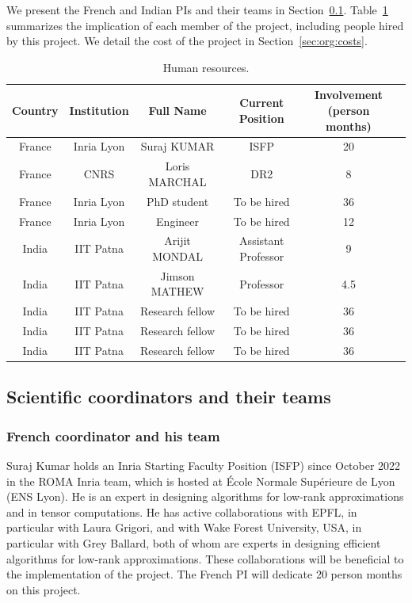 \documentclass[a4paper,11pt]{article}
\begin{document}
We present the French and Indian PIs and their teams in Section~\ref{sec:org:team}. Table~\ref{tab:human} summarizes the implication of each member of the project, including people hired by this project. We detail the cost of the project in Section~\ref{sec:org:costs}.
	\begin{table}[htb]
	\begin{center}
		\begin{center}
			\begin{tabular}{|c|c|c|c|c|c|}
				\hline
				\textbf{Country} & \textbf{Institution} & \textbf{Full Name} & \textbf{Current Position} & \makecell{\bf Involvement\\ (person months)} \\
				\hline
				France & Inria Lyon & Suraj KUMAR   & ISFP  & 20\\ \hline
				France & CNRS & Loris MARCHAL & DR2  & 8\\ \hline
				France & Inria Lyon & PhD student & To be hired  & 36\\ \hline
				France & Inria Lyon & Engineer & To be hired & 12\\ \hline
				\hline
				India & IIT Patna & Arijit MONDAL  & Assistant Professor & 9\\ \hline
				India & IIT Patna & Jimson MATHEW & Professor & 4.5\\ \hline
				India & IIT Patna & Research fellow & To be hired & 36\\ \hline
				India & IIT Patna & Research fellow & To be hired & 36\\ \hline
				India & IIT Patna & Research fellow & To be hired & 36\\ \hline
			\end{tabular}
		\end{center}
	\end{center}
	\caption{Human resources.}
	\label{tab:human}
\end{table}


\subsection{Scientific coordinators and their teams}
\label{sec:org:team}

\subsubsection{French coordinator and his team}
Suraj Kumar holds an Inria Starting Faculty Position (ISFP) since October 2022 in the ROMA Inria team, which is hosted at École Normale Supérieure de Lyon (ENS Lyon). He is an expert in designing algorithms for low-rank approximations and in tensor computations. He has active collaborations with EPFL, in particular with Laura Grigori, and with Wake Forest University, USA, in particular with Grey Ballard, both of whom are experts in designing efficient algorithms for low-rank approximations. These collaborations will be beneficial to the implementation of the project. The French PI will dedicate 20 person months on this project.
\end{document}
